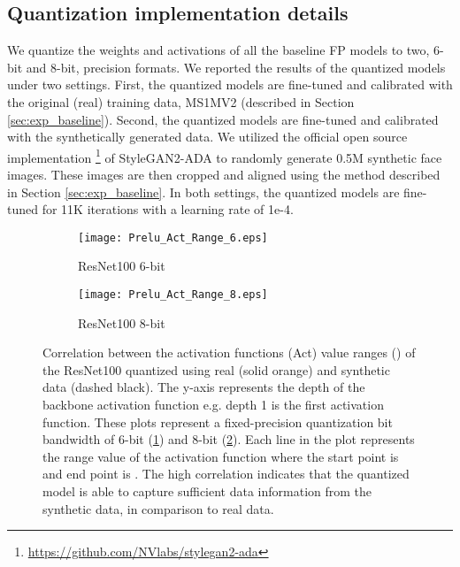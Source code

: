 \documentclass[a4paper,conference]{IEEEtran}
\begin{document}
\subsection{Quantization implementation details}
We quantize the weights and activations of all the baseline FP models to two, 6-bit and 8-bit, precision formats. 
We reported the results of the quantized models under two settings. 
First, the quantized models are fine-tuned and calibrated with the original (real) training data, MS1MV2 \cite{guo2016ms,deng2019arcface} (described in Section \ref{sec:exp_baseline}). 
Second, the quantized models are fine-tuned and calibrated with the synthetically generated data.
We utilized the official open source implementation \footnote{\url{https://github.com/NVlabs/stylegan2-ada}} of StyleGAN2-ADA to randomly generate 0.5M synthetic face images.
These images are then cropped and aligned using the method described in Section \ref{sec:exp_baseline}.
In both settings, the quantized models are fine-tuned for 11K iterations with a learning rate of 1e-4.

\begin{figure}[!t]
     \centering
     \begin{subfigure}[b]{0.40\linewidth}
         \centering
         \texttt{[image: Prelu\_Act\_Range\_6.eps]}
         \caption{ResNet100 6-bit}
         \label{fig:r100_6}
     \end{subfigure}
      \begin{subfigure}[b]{0.40\linewidth}
         \centering
         \texttt{[image: Prelu\_Act\_Range\_8.eps]}
         \caption{ResNet100 8-bit}
         \label{fig:r100_8}
     \end{subfigure}
     \vspace{-1mm}
             \caption{Correlation between the activation functions (Act) value ranges () of the ResNet100 quantized using real (solid orange) and synthetic data (dashed black).
             The y-axis represents the depth of the backbone activation function e.g. depth 1 is the first activation function.  
             These plots represent a fixed-precision quantization bit bandwidth of 6-bit (\ref{fig:r100_6}) and 8-bit (\ref{fig:r100_8}).
             Each line in the plot represents the range value of the activation function where the start point is  and end point is .
             The high correlation indicates that the quantized model is able to capture sufficient data information from the synthetic data, in comparison to real data.
             }
        \label{fig:act}
        \vspace{-4mm}
\end{figure}
\end{document}
